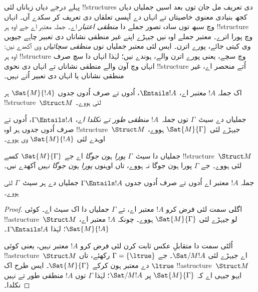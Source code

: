 \documentclass[../../../include/open-logic-section]{subfiles}
\begin{document}

\begin{explain}
پہلے درجے دیاں زباناں لئی !!{structure}s دی تعریف مل جان توں بعد
اسیں جملیاں دیاں کجھ بنیادی معنوی خاصیتاں تے انہاں دے آپسی
تعلقاں دی تعریف کر سکدے آں۔ انہاں وچ سبھ توں سادہ تصور
جملے دا \emph{منطقی اعتبار} اے۔ جملہ معتبر اے جے اوہ ہر
!!{structure} وچ پورا اترے۔ معتبر جملے اوہ نیں جیہڑے اپنے
غیر منطقی نشاناں دی تعبیر چاہے جیویں وی کیتی جائے، پورے اترن۔
ایس لئی معتبر جملیاں نوں \emph{منطقی سچائیاں} وی آکھدے نیں:
اوہ ہر !!{structure} وچ سچے، یعنی پورے اترن والے، ہوندے نیں؛
لہٰذا انہاں دا سچ صرف انہاں وچ آون والے منطقی نشاناں تے انہاں
دی نحوی !!{structure} اُتے منحصر اے، غیر منطقی نشاناں یا انہاں دی تعبیر
اُتے نہیں۔
\end{explain}

\begin{defn}
اک جملہ $!A$ \emph{معتبر} اے، $\Entails !A$، اُدوں تے صرف اُدوں
جدوں $\Sat{M}{!A}$ ہر !!{structure}~$\Struct M$ لئی ہووے۔
\end{defn}

\begin{defn}
جملیاں دے سیٹ~$\Gamma$ توں جملہ~$!A$ \emph{منطقی طور تے نکلدا اے}،
$\Gamma \Entails !A$، اُدوں تے صرف اُدوں جدوں ہر اوہ !!{structure}~$\Struct M$
جیہڑے لئی $\Sat{M}{\Gamma}$ ہووے، اوہدے لئی $\Sat{M}{!A}$ وی ہووے۔
\end{defn}


\begin{defn}
جملیاں دا سیٹ~$\Gamma$ \emph{پورا ہون جوگا} اے جے
$\Sat{M}{\Gamma}$ کسے !!{structure}~$\Struct M$ لئی ہووے۔ جے
$\Gamma$ پورا ہون جوگا نہ ہووے، تاں اوہنوں \emph{پورا ہون جوگا نہیں} آکھدے نیں۔
\end{defn}

\begin{prop}
جملہ $!A$ معتبر اے اُدوں تے صرف اُدوں جدوں $\Gamma \Entails !A$
جملیاں دے ہر سیٹ~$\Gamma$ لئی ہووے۔
\end{prop}

\begin{proof}
اگلی سمت لئی فرض کرو $!A$ معتبر اے، تے $\Gamma$ جملیاں دا
اک سیٹ اے۔ کوئی !!a{structure}~$\Struct M$ لو جیہڑے لئی
$\Sat{M}{\Gamma}$ ہووے۔ چونکہ $!A$ معتبر اے، $\Sat{M}{!A}$؛
لہٰذا $\Gamma \Entails !A$۔

اُلٹی سمت دا متقابلِ عکس ثابت کرن لئی فرض کرو $!A$ معتبر نہیں،
یعنی کوئی !!a{structure}~$\Struct M$ اے جیہڑے لئی $\Sat/{M}{!A}$۔
جے $\Gamma = \{ \ltrue \}$ رکھئے، تاں $\ltrue$ دے معتبر ہون کرکے
$\Sat{M}{\Gamma}$۔ ایس طرح اک !!a{structure}~$\Struct M$
ایہو جیہی اے کہ $\Sat{M}{\Gamma}$ پر $\Sat/{M}{!A}$؛ لہٰذا
$\Gamma$ توں $!A$ منطقی طور تے نہیں نکلدا۔
\end{proof}
\end{document}
